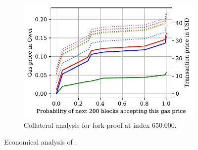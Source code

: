 \begin{figure}[h]
\begin{subfigure}{0.97\linewidth}
    \begin{center}
        \includegraphics[width=1\columnwidth]{figures/cryptoeconomics-650K.pdf}
    \end{center}
    \caption{Collateral analysis for fork proof at index 650.000.}
    \label{fig:cryptoeconomics-650K}
\end{subfigure}
\caption{Economical analysis of \name.}
\label{fig:cryptoeconomics}
\end{figure}


